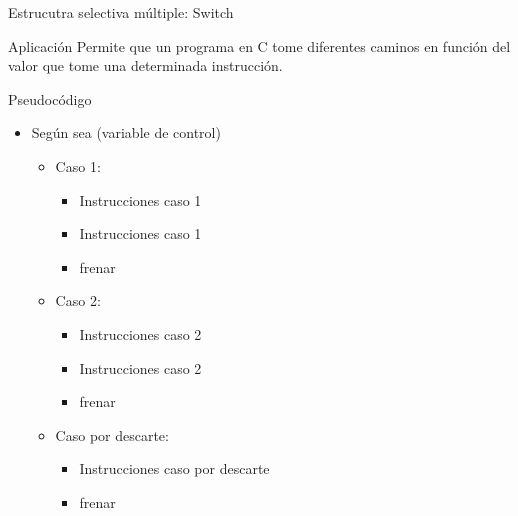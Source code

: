 \documentclass[xcolor=pdftex,table,11pt]{beamer}
\begin{document}
\begin{frame}{Estrucutra selectiva múltiple: Switch}

 \begin{block}{Aplicación}
 Permite que un programa en C tome diferentes caminos en función del valor que tome una determinada instrucción.
 
 
 \end{block}

 \begin{block}{Pseudocódigo}

    \begin{itemize}
   \item[]Según sea (variable de control)
   \begin{itemize}

     	\item[] Caso 1:
     	    \begin{itemize}
     			\item[] Instrucciones caso 1
     			\item[] Instrucciones caso 1
     			\item[] frenar
     		   \end{itemize}

        \item[] Caso 2:
     	    \begin{itemize}
     			\item[] Instrucciones caso 2
     			\item[] Instrucciones caso 2

     			\item[] frenar
 		
   			\end{itemize}
    
    \item[] Caso por descarte:
     	    \begin{itemize}
     			\item[] Instrucciones caso por descarte
     			\item[] frenar
 		
   			\end{itemize}
 		
   \end{itemize}

	\end{itemize}


 \end{block}





\end{frame}
\end{document}
